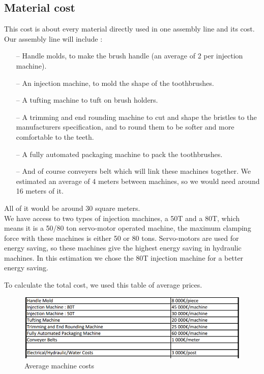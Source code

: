 \subsection{Material cost}
This cost is about every material directly used in one assembly line and its cost.
Our assembly line will include : \\
\begin{itemize}
	\item[--] Handle molds, to make the brush handle (an average of 2 per injection machine).
	\item[--] An injection machine, to mold the shape of the toothbrushes.
	\item[--] A tufting machine to tuft on brush holders.
	\item[--] A trimming and end rounding machine to cut and shape the bristles to the manufacturers specification, and to round them to be softer and more comfortable to the teeth.
	\item[--] A fully automated packaging machine to pack the toothbrushes.
	\item[--] And of course conveyers belt which will link these machines together. We estimated an average of 4 meters between machines, so we would need around 16 meters of it. \\
\end{itemize}

All of it would be around 30 square meters. \\
We have access to two types of injection machines, a 50T and a 80T, which means it is a 50/80 ton servo-motor operated machine, the maximum clamping force with these machines is either 50 or 80 tons. Servo-motors are used for energy saving, so these machines give the highest energy saving in hydraulic machines. In this estimation we chose the 80T injection machine for a better energy saving.

To calculate the total cost, we used this table of average prices. \clearpage

\begin{figure}[h]

	\centering
	\includegraphics[scale=0.9]{Img/averageMachineCost.png}
	\caption{Average machine costs}

\end{figure}

